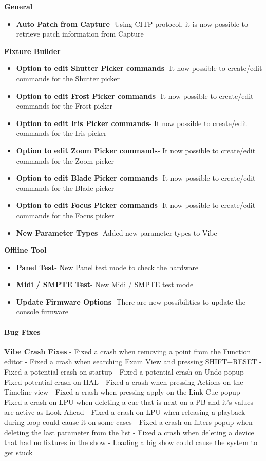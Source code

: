 \documentclass[
]{article}
\providecommand{\tightlist}{%
  \setlength{\itemsep}{0pt}\setlength{\parskip}{0pt}}
\begin{document}
\textbf{General}

\begin{itemize}
\tightlist
\item
  \textbf{Auto Patch from Capture}- Using CITP protocol, it is now possible to retrieve patch information from Capture
\end{itemize}

\textbf{Fixture Builder}

\begin{itemize}
\item
  \textbf{Option to edit Shutter Picker commands}- It now possible to create/edit commands for the Shutter picker
\item
  \textbf{Option to edit Frost Picker commands}- It now possible to create/edit commands for the Frost picker
\item
  \textbf{Option to edit Iris Picker commands}- It now possible to create/edit commands for the Iris picker
\item
  \textbf{Option to edit Zoom Picker commands}- It now possible to create/edit commands for the Zoom picker
\item
  \textbf{Option to edit Blade Picker commands}- It now possible to create/edit commands for the Blade picker
\item
  \textbf{Option to edit Focus Picker commands}- It now possible to create/edit commands for the Focus picker
\item
  \textbf{New Parameter Types}- Added new parameter types to Vibe
\end{itemize}

\textbf{Offline Tool}

\begin{itemize}
\item
  \textbf{Panel Test}- New Panel test mode to check the hardware
\item
  \textbf{Midi / SMPTE Test}- New Midi / SMPTE test mode
\item
  \textbf{Update Firmware Options}- There are new possibilities to update the console firmware
\end{itemize}

\hypertarget{bug-fixes-4}{%
\paragraph{Bug Fixes}\label{bug-fixes-4}}

\textbf{Vibe Crash Fixes}
- Fixed a crash when removing a point from the Function editor
- Fixed a crash when searching Exam View and pressing SHIFT+RESET
- Fixed a potential crash on startup
- Fixed a potential crash on Undo popup
- Fixed potential crash on HAL
- Fixed a crash when pressing Actions on the Timeline view
- Fixed a crash when pressing apply on the Link Cue popup
- Fixed a crash on LPU when deleting a cue that is next on a PB and it's values are active as Look Ahead
- Fixed a crash on LPU when releasing a playback during loop could cause it on some cases
- Fixed a crash on filters popup when deleting the last parameter from the list
- Fixed a crash when deleting a device that had no fixtures in the show
- Loading a big show could cause the system to get stuck
\end{document}
